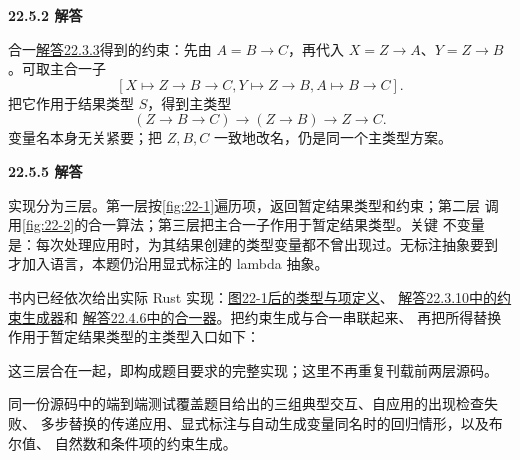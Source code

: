 \begin{taplsolutionentrybox}
\label{sol:translator:22.5.2}
\textbf{22.5.2 解答}

合一\hyperref[sol:translator:22.3.3]{解答22.3.3}得到的约束：先由 \(A=B\to C\)，再代入
\(X=Z\to A\)、\(Y=Z\to B\)。可取主合一子
\[
[X\mapsto Z\to B\to C,
  Y\mapsto Z\to B,
  A\mapsto B\to C].
\]
把它作用于结果类型 \(S\)，得到主类型
\[
(Z\to B\to C)\to(Z\to B)\to Z\to C.
\]
变量名本身无关紧要；把 \(Z,B,C\) 一致地改名，仍是同一个主类型方案。

\end{taplsolutionentrybox}

\begin{taplsolutionentrybox}
\label{sol:translator:22.5.5}
\textbf{22.5.5 解答}

实现分为三层。第一层按\cref{fig:22-1}遍历项，返回暂定结果类型和约束；第二层
调用\cref{fig:22-2}的合一算法；第三层把主合一子作用于暂定结果类型。关键
不变量是：每次处理应用时，为其结果创建的类型变量都不曾出现过。无标注抽象要到
才加入语言，本题仍沿用显式标注的 lambda 抽象。

书内已经依次给出实际 Rust 实现：\hyperref[fig:22-1]{图22-1后的类型与项定义}、
\hyperref[sol:author:22.3.10]{解答22.3.10中的约束生成器}和
\hyperref[sol:author:22.4.6]{解答22.4.6中的合一器}。把约束生成与合一串联起来、
再把所得替换作用于暂定结果类型的主类型入口如下：

这三层合在一起，即构成题目要求的完整实现；这里不再重复刊载前两层源码。

同一份源码中的端到端测试覆盖题目给出的三组典型交互、自应用的出现检查失败、
多步替换的传递应用、显式标注与自动生成变量同名时的回归情形，以及布尔值、
自然数和条件项的约束生成。

\end{taplsolutionentrybox}

